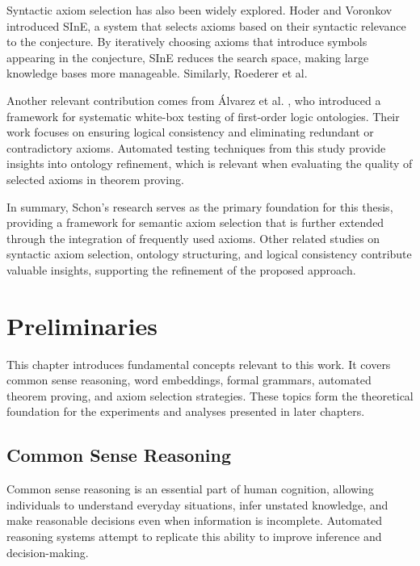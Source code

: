 \documentclass[english,version-2020-11]{uzl-thesis}
\begin{document}
Syntactic axiom selection has also been widely explored. Hoder and Voronkov \cite{Hoder2011} introduced SInE, a system that selects axioms based on their syntactic relevance to the conjecture. By iteratively choosing axioms that introduce symbols appearing in the conjecture, SInE reduces the search space, making large knowledge bases more manageable. Similarly, Roederer et al.

Another relevant contribution comes from Álvarez et al. \cite{Alvez2017}, who introduced a framework for systematic white-box testing of first-order logic ontologies. Their work focuses on ensuring logical consistency and eliminating redundant or contradictory axioms. Automated testing techniques from this study provide insights into ontology refinement, which is relevant when evaluating the quality of selected axioms in theorem proving.

In summary, Schon’s research serves as the primary foundation for this thesis, providing a framework for semantic axiom selection that is further extended through the integration of frequently used axioms. Other related studies on syntactic axiom selection, ontology structuring, and logical consistency contribute valuable insights, supporting the refinement of the proposed approach.


%

\chapter{Preliminaries}
\label{chapter-preliminaries}

This chapter introduces fundamental concepts relevant to this work. It covers common sense reasoning, word embeddings, formal grammars, automated theorem proving, and axiom selection strategies. These topics form the theoretical foundation for the experiments and analyses presented in later chapters.

\section{Common Sense Reasoning}

Common sense reasoning is an essential part of human cognition, allowing individuals to understand everyday situations, infer unstated knowledge, and make reasonable decisions even when information is incomplete. Automated reasoning systems attempt to replicate this ability to improve inference and decision-making.
\end{document}
